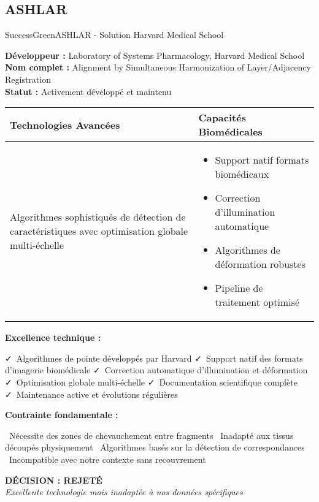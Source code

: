 \documentclass[11pt,a4paper]{article}
\newcommand{\pro}[1]{\textcolor{SuccessGreen}{\faCheck\ #1}}
\newcommand{\con}[1]{\textcolor{DangerRed}{\faTimes\ #1}}
\begin{document}
\subsection{ASHLAR}

\begin{techbox}{SuccessGreen}{ASHLAR - Solution Harvard Medical School}

\textbf{Développeur :} Laboratory of Systems Pharmacology, Harvard Medical School \\
\textbf{Nom complet :} Alignment by Simultaneous Harmonization of Layer/Adjacency Registration \\
\textbf{Statut :} Activement développé et maintenu

\vspace{0.5cm}

\begin{tabularx}{\textwidth}{|X|X|}
\hline
\rowcolor{LightGray}
\textbf{Technologies Avancées} & \textbf{Capacités Biomédicales} \\
\hline
Algorithmes sophistiqués de détection de caractéristiques avec optimisation globale multi-échelle &
\begin{itemize}[nosep]
\item Support natif formats biomédicaux
\item Correction d'illumination automatique
\item Algorithmes de déformation robustes
\item Pipeline de traitement optimisé
\end{itemize} \\
\hline
\end{tabularx}

\vspace{0.5cm}

\textbf{Excellence technique :}
\begin{itemize}[leftmargin=*]
    \pro{Algorithmes de pointe développés par Harvard}
    \pro{Support natif des formats d'imagerie biomédicale}
    \pro{Correction automatique d'illumination et déformation}
    \pro{Optimisation globale multi-échelle}
    \pro{Documentation scientifique complète}
    \pro{Maintenance active et évolutions régulières}
\end{itemize}

\textbf{Contrainte fondamentale :}
\begin{itemize}[leftmargin=*]
    \con{Nécessite des zones de chevauchement entre fragments}
    \con{Inadapté aux tissus découpés physiquement}
    \con{Algorithmes basés sur la détection de correspondances}
    \con{Incompatible avec notre contexte sans recouvrement}
\end{itemize}

\begin{center}
\textbf{\textcolor{WarningOrange}{DÉCISION : REJETÉ}}\\
\textit{Excellente technologie mais inadaptée à nos données spécifiques}
\end{center}

\end{techbox}
\end{document}
